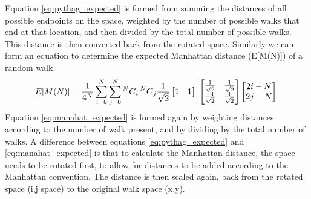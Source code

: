  	Equation \ref{eq:pythag_expected} is formed from summing the distances of all possible endpoints on the space, weighted by the number of possible walks that end at that location, and then divided by the total number of possible walks. This distance is then converted back from the rotated space. 
 	Similarly we can form an equation to determine the expected Manhattan distance (E[M(N)]) of a random walk. 
 	\begin{equation}
 	E[M(N)] = \frac{1}{4^N}\sum_{i=0}^{N}\sum_{j=0}^{N}\prescript{N}{}{C}_{i}\prescript{N}{}{C}_{j} \frac{1}{\sqrt{2}} 
 	\begin{bmatrix}
 	1&1\\
 	\end{bmatrix} 
 	\left|
 	\begin{bmatrix}
 	\frac{1}{\sqrt{2}} & \frac{1}{\sqrt{2}} \\
 	\frac{-1}{\sqrt{2}} & \frac{1}{\sqrt{2}} 
 	\end{bmatrix}
 	\begin{bmatrix}
 	2i-N \\
 	2j-N
 	\end{bmatrix}
 	\right|
 	\label{eq:manahat_expected}
 	\end{equation}
 	Equation \ref{eq:manahat_expected} is formed again by weighting distances according to the number of walk present, and by dividing by the total number of walks. A difference between equations \ref{eq:pythag_expected} and \ref{eq:manahat_expected} is that to calculate the Manhattan distance, the space needs to be rotated first, to allow for distances to be added according to the Manhattan convention. The distance is then scaled again, back from the rotated space (i,j space) to the original walk space (x,y). 
